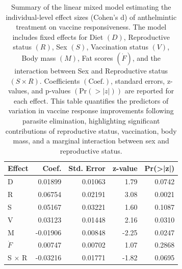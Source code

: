 \documentclass[a4paper, hidelinks, 11pt]{article}
\begin{document}
\begin{table}[htbp]
	\centering
	\caption{Summary of the linear mixed model estimating the individual-level effect sizes (Cohen's d) of anthelmintic treatment on vaccine responsiveness. The model includes fixed effects for Diet \((D)\), Reproductive status \((R)\), Sex \((S)\), Vaccination status \((V)\), Body mass \((M)\), Fat scores \((\dot{F})\), and the interaction between Sex and Reproductive status \((S \times R)\). Coefficients \((\text{Coef.})\), standard errors, z-values, and p-values \((\text{Pr}(>|z|))\) are reported for each effect. This table quantifies the predictors of variation in vaccine response improvements following parasite elimination, highlighting significant contributions of reproductive status, vaccination, body mass, and a marginal interaction between sex and reproductive status.}
	\begin{tabular}{|l|r|r|r|r|}
		\hline
		\textbf{Effect} & \textbf{Coef.} & \textbf{Std. Error} & \textbf{z-value} & \textbf{Pr(>|z|)} \\
		\hline
		D               & 0.01899        & 0.01063             & 1.79             & 0.0742            \\
		R               & 0.06754        & 0.02191             & 3.08             & 0.0021            \\
		S               & 0.05167        & 0.03221             & 1.60             & 0.1087            \\
		V               & 0.03123        & 0.01448             & 2.16             & 0.0310            \\
		M               & -0.01906       & 0.00848             & -2.25            & 0.0247            \\
		$\dot{F}$       & 0.00747        & 0.00702             & 1.07             & 0.2868            \\
		S $\times$ R    & -0.03216       & 0.01771             & -1.82            & 0.0695            \\
		\hline
	\end{tabular}
	\label{tbl:cohens_d_interaction}
\end{table}
\end{document}

